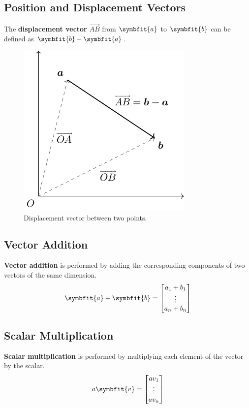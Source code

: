 \documentclass{article}
\begin{document}
\subsection{Position and Displacement Vectors}
\begin{definition}
    The \textbf{displacement vector} \(\overrightarrow{AB}\) from
    \(\symbfit{a}\) to \(\symbfit{b}\) can be defined as
    \(\symbfit{b}-\symbfit{a}\).
    \begin{figure}[H]
        \centering
        \includegraphics*{figures/vector_position}
        \caption{Displacement vector between two points.}
    \end{figure}
\end{definition}
\subsection{Vector Addition}
\begin{definition}
    \textbf{Vector addition} is performed by adding the corresponding
    components of two vectors of the same dimension.
    \begin{equation*}
        \symbfit{a} + \symbfit{b} =
        \begin{bmatrix}
            a_1+b_1 \\
            \vdots  \\
            a_n+b_n
        \end{bmatrix}
    \end{equation*}
\end{definition}
\subsection{Scalar Multiplication}
\begin{definition}
    \textbf{Scalar multiplication} is performed by multiplying each
    element of the vector by the scalar.
    \begin{equation*}
        a\symbfit{v} =
        \begin{bmatrix}
            av_1   \\
            \vdots \\
            av_n
        \end{bmatrix}
    \end{equation*}
\end{definition}
\end{document}

